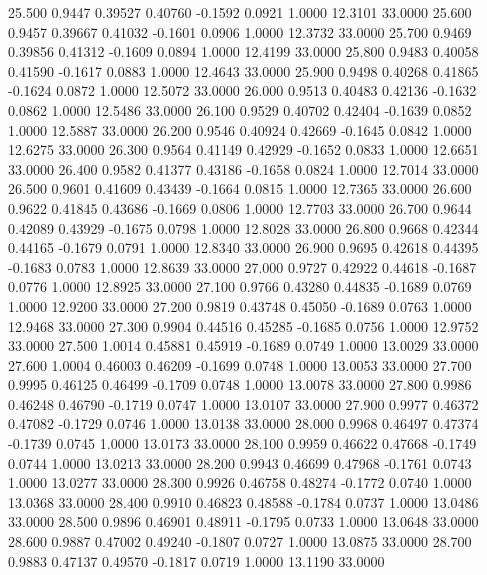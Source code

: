   25.500   0.9447   0.39527   0.40760  -0.1592   0.0921   1.0000  12.3101  33.0000
  25.600   0.9457   0.39667   0.41032  -0.1601   0.0906   1.0000  12.3732  33.0000
  25.700   0.9469   0.39856   0.41312  -0.1609   0.0894   1.0000  12.4199  33.0000
  25.800   0.9483   0.40058   0.41590  -0.1617   0.0883   1.0000  12.4643  33.0000
  25.900   0.9498   0.40268   0.41865  -0.1624   0.0872   1.0000  12.5072  33.0000
  26.000   0.9513   0.40483   0.42136  -0.1632   0.0862   1.0000  12.5486  33.0000
  26.100   0.9529   0.40702   0.42404  -0.1639   0.0852   1.0000  12.5887  33.0000
  26.200   0.9546   0.40924   0.42669  -0.1645   0.0842   1.0000  12.6275  33.0000
  26.300   0.9564   0.41149   0.42929  -0.1652   0.0833   1.0000  12.6651  33.0000
  26.400   0.9582   0.41377   0.43186  -0.1658   0.0824   1.0000  12.7014  33.0000
  26.500   0.9601   0.41609   0.43439  -0.1664   0.0815   1.0000  12.7365  33.0000
  26.600   0.9622   0.41845   0.43686  -0.1669   0.0806   1.0000  12.7703  33.0000
  26.700   0.9644   0.42089   0.43929  -0.1675   0.0798   1.0000  12.8028  33.0000
  26.800   0.9668   0.42344   0.44165  -0.1679   0.0791   1.0000  12.8340  33.0000
  26.900   0.9695   0.42618   0.44395  -0.1683   0.0783   1.0000  12.8639  33.0000
  27.000   0.9727   0.42922   0.44618  -0.1687   0.0776   1.0000  12.8925  33.0000
  27.100   0.9766   0.43280   0.44835  -0.1689   0.0769   1.0000  12.9200  33.0000
  27.200   0.9819   0.43748   0.45050  -0.1689   0.0763   1.0000  12.9468  33.0000
  27.300   0.9904   0.44516   0.45285  -0.1685   0.0756   1.0000  12.9752  33.0000
  27.500   1.0014   0.45881   0.45919  -0.1689   0.0749   1.0000  13.0029  33.0000
  27.600   1.0004   0.46003   0.46209  -0.1699   0.0748   1.0000  13.0053  33.0000
  27.700   0.9995   0.46125   0.46499  -0.1709   0.0748   1.0000  13.0078  33.0000
  27.800   0.9986   0.46248   0.46790  -0.1719   0.0747   1.0000  13.0107  33.0000
  27.900   0.9977   0.46372   0.47082  -0.1729   0.0746   1.0000  13.0138  33.0000
  28.000   0.9968   0.46497   0.47374  -0.1739   0.0745   1.0000  13.0173  33.0000
  28.100   0.9959   0.46622   0.47668  -0.1749   0.0744   1.0000  13.0213  33.0000
  28.200   0.9943   0.46699   0.47968  -0.1761   0.0743   1.0000  13.0277  33.0000
  28.300   0.9926   0.46758   0.48274  -0.1772   0.0740   1.0000  13.0368  33.0000
  28.400   0.9910   0.46823   0.48588  -0.1784   0.0737   1.0000  13.0486  33.0000
  28.500   0.9896   0.46901   0.48911  -0.1795   0.0733   1.0000  13.0648  33.0000
  28.600   0.9887   0.47002   0.49240  -0.1807   0.0727   1.0000  13.0875  33.0000
  28.700   0.9883   0.47137   0.49570  -0.1817   0.0719   1.0000  13.1190  33.0000
